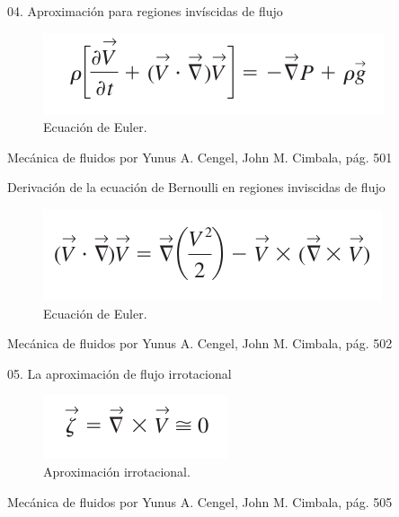 
\begin{frame}{04. Aproximación para regiones invíscidas de flujo}
\justifying
\begin{figure}[H]
\centering
\includegraphics[scale=0.35]{Section_Files/S3-imagenes-Jhon/0035.png}
\caption{Ecuación de Euler.}
\end{figure}
{\tiny Mecánica de fluidos por Yunus A. Cengel, John M. Cimbala, pág. 501}
\end{frame}


\begin{frame}{Derivación de la ecuación de Bernoulli en regiones inviscidas de flujo}
\justifying
\begin{figure}[H]
\centering
\includegraphics[scale=0.35]{Section_Files/S3-imagenes-Jhon/0037.png}
\caption{Ecuación de Euler.}
\end{figure}
{\tiny Mecánica de fluidos por Yunus A. Cengel, John M. Cimbala, pág. 502}
\end{frame}


\begin{frame}{05. La aproximación de flujo irrotacional}
\justifying
\begin{figure}[H]
\centering
\includegraphics[scale=0.35]{Section_Files/S3-imagenes-Jhon/0048.png}
\caption{Aproximación irrotacional.}
\end{figure}
{\tiny Mecánica de fluidos por Yunus A. Cengel, John M. Cimbala, pág. 505}
\end{frame}


